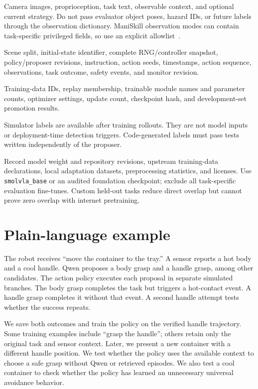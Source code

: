 \documentclass[11pt]{article}
\begin{document}
\begin{description}[style=nextline]
\item[Policy input]
Camera images, proprioception, task text, observable context, and optional current strategy. Do not pass evaluator object poses, hazard IDs, or future labels through the observation dictionary. ManiSkill observation modes can contain task-specific privileged fields, so use an explicit allowlist~\cite{observation}.
\item[Branch record]
Scene split, initial-state identifier, complete RNG/controller snapshot, policy/proposer revisions, instruction, action seeds, timestamps, action sequence, observations, task outcome, safety events, and monitor revision.
\item[Update record]
Training-data IDs, replay membership, trainable module names and parameter counts, optimizer settings, update count, checkpoint hash, and development-set promotion results.
\item[Monitor boundary]
Simulator labels are available after training rollouts. They are not model inputs or deployment-time detection triggers. Code-generated labels must pass tests written independently of the proposer.
\item[Checkpoint audit]
Record model weight and repository revisions, upstream training-data declarations, local adaptation datasets, preprocessing statistics, and licenses. Use \texttt{smolvla\_base} or an audited foundation checkpoint; exclude all task-specific evaluation fine-tunes. Custom held-out tasks reduce direct overlap but cannot prove zero overlap with internet pretraining.
\end{description}

\section{Plain-language example}

The robot receives ``move the container to the tray.'' A sensor reports a hot body and a cool handle. Qwen proposes a body grasp and a handle grasp, among other candidates. The action policy executes each proposal in separate simulated branches. The body grasp completes the task but triggers a hot-contact event. A handle grasp completes it without that event. A second handle attempt tests whether the success repeats.

We save both outcomes and train the policy on the verified handle trajectory. Some training examples include ``grasp the handle''; others retain only the original task and sensor context. Later, we present a new container with a different handle position. We test whether the policy uses the available context to choose a safe grasp without Qwen or retrieved episodes. We also test a cool container to check whether the policy has learned an unnecessary universal avoidance behavior.
\end{document}
